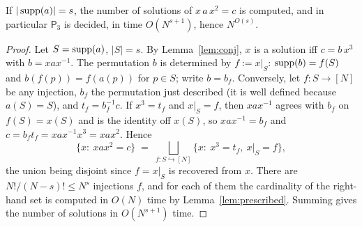 \documentclass[preprint,12pt]{elsarticle}
\theoremstyle{definition}\newtheorem{defi}[thm]{Definition}\newtheorem{prob}[thm]{Problem}\newtheorem{obs}[thm]{Observation}
\theoremstyle{remark}\newtheorem{rem}[thm]{Remark}
\newcommand{\Pthree}{\mathsf{P}_3}\newcommand{\Conj}[1]{\mathsf{Conj}_{#1}}\newcommand{\Dzero}{\Conj{3}}\newcommand{\TR}{T_{\mathcal R}}
\begin{document}
\begin{lem}\label{lem:support}
If $|\operatorname{supp}(a)|=s$, the number of solutions of $x\,a\,x^{2}=c$ is computed, and in particular $\Pthree$ is decided, in time $O(N^{s+1})$, hence $N^{O(s)}$.
\end{lem}
\begin{proof}
Let $S=\operatorname{supp}(a)$, $|S|=s$. By Lemma~\ref{lem:conj}, $x$ is a solution iff $c=b\,x^{3}$ with $b=xax^{-1}$. The permutation $b$ is determined by $f:=x|_{S}$: $\operatorname{supp}(b)=f(S)$ and $b(f(p))=f(a(p))$ for $p\in S$; write $b=b_f$. Conversely, let $f\colon S\to[N]$ be any injection, $b_f$ the permutation just described (it is well defined because $a(S)=S$), and $t_f=b_f^{-1}c$. If $x^{3}=t_f$ and $x|_S=f$, then $xax^{-1}$ agrees with $b_f$ on $f(S)=x(S)$ and is the identity off $x(S)$, so $xax^{-1}=b_f$ and $c=b_f t_f=xax^{-1}x^{3}=xax^{2}$. Hence
\[
\{x:\ xax^{2}=c\}\;=\;\bigsqcup_{f\colon S\hookrightarrow[N]}\{x:\ x^{3}=t_f,\ x|_{S}=f\},
\]
the union being disjoint since $f=x|_S$ is recovered from $x$. There are $N!/(N-s)!\le N^{s}$ injections $f$, and for each of them the cardinality of the right-hand set is computed in $O(N)$ time by Lemma~\ref{lem:prescribed}. Summing gives the number of solutions in $O(N^{s+1})$ time.
\end{proof}
\end{document}

